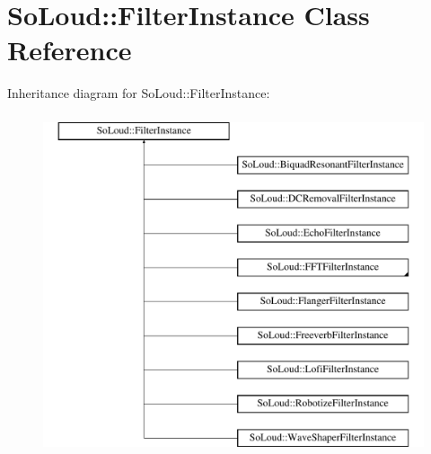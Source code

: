 \hypertarget{class_so_loud_1_1_filter_instance}{}\section{So\+Loud\+::Filter\+Instance Class Reference}
\label{class_so_loud_1_1_filter_instance}
Inheritance diagram for So\+Loud\+::Filter\+Instance\+:\begin{figure}[H]
\begin{center}
\leavevmode
\includegraphics[height=10.000000cm]{class_so_loud_1_1_filter_instance}
\end{center}
\end{figure}
